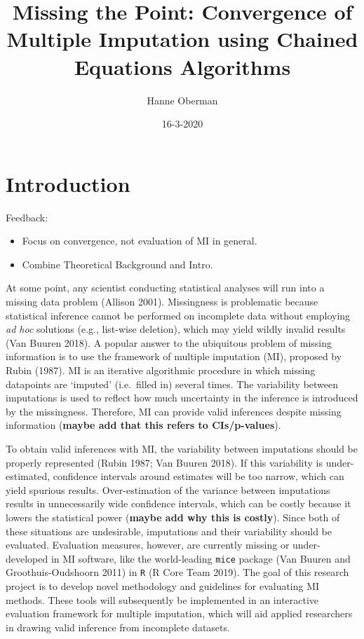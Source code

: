 \documentclass[
]{article}
\title{Missing the Point: Convergence of Multiple Imputation using Chained
Equations Algorithms}
\author{Hanne Oberman}
\date{16-3-2020}
\begin{document}
\maketitle

\hypertarget{introduction}{%
\section{Introduction}\label{introduction}}

Feedback:

\begin{itemize}
\item
  Focus on convergence, not evaluation of MI in general.
\item
  Combine Theoretical Background and Intro.
\end{itemize}

At some point, any scientist conducting statistical analyses will run
into a missing data problem (Allison 2001). Missingness is problematic
because statistical inference cannot be performed on incomplete data
without employing \emph{ad hoc} solutions (e.g., list-wise deletion),
which may yield wildly invalid results (Van Buuren 2018). A popular
answer to the ubiquitous problem of missing information is to use the
framework of multiple imputation (MI), proposed by Rubin (1987). MI is
an iterative algorithmic procedure in which missing datapoints are
`imputed' (i.e.~filled in) several times. The variability between
imputations is used to reflect how much uncertainty in the inference is
introduced by the missingness. Therefore, MI can provide valid
inferences despite missing information (\textbf{maybe add that this
refers to CIs/p-values}).

To obtain valid inferences with MI, the variability between imputations
should be properly represented (Rubin 1987; Van Buuren 2018). If this
variability is under-estimated, confidence intervals around estimates
will be too narrow, which can yield spurious results. Over-estimation of
the variance between imputations results in unnecessarily wide
confidence intervals, which can be costly because it lowers the
statistical power (\textbf{maybe add why this is costly}). Since both of
these situations are undesirable, imputations and their variability
should be evaluated. Evaluation measures, however, are currently missing
or under-developed in MI software, like the world-leading \texttt{mice}
package (Van Buuren and Groothuis-Oudshoorn 2011) in \texttt{R} (R Core
Team 2019). The goal of this research project is to develop novel
methodology and guidelines for evaluating MI methods. These tools will
subsequently be implemented in an interactive evaluation framework for
multiple imputation, which will aid applied researchers in drawing valid
inference from incomplete datasets.
\end{document}
